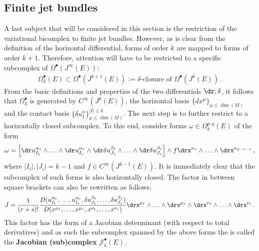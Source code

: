 \subsection{Finite jet bundles}

    A last subject that will be considered in this section is the restriction of the variational bicomplex to finite jet bundles. However, as is clear from the definition of the horizontal differential, forms of order $k$ are mapped to forms of order $k+1$. Therefore, attention will have to be restricted to a specific subcomplex of $\Omega^\bullet(J^\infty(E))$:
    \begin{gather}
        \Omega^\bullet_k(E)\subset\Omega^\bullet(J^{k+1}(E)) := \delta\text{-closure of }\Omega^\bullet(J^k(E))\,.
    \end{gather}
    From the basic definitions and properties of the two differentials $\dr,\delta$, it follows that $\Omega^\bullet_k$ is generated by $C^\infty(J^k(E))$, the horizontal basis $\{dx^\mu\}_{\mu\leq\dim(M)}$ and the contact basis $\{\delta u^\alpha_I\}_{\mu\leq\dim(M)}^{|I|\leq k}$.
    The next step is to further restrict to a horizontally closed subcomplex. To this end, consider forms $\omega\in\Omega^{p,q}_k(E)$ of the form
    \begin{gather}
        \omega = \left[\dr u^{\alpha_1}_{I_1}\wedge\ldots\wedge \dr u^{\alpha_r}_{I_r}\wedge\dr\delta u^{\beta_1}_{J_1}\wedge\ldots\wedge\dr\delta u^{\beta_s}_{J_s}\right]\wedge f\drx^{\kappa_1}\wedge\ldots\wedge \drx^{\kappa_{p-r-s}}\,,
    \end{gather}
    where $|I_i|,|J_i|=k-1$ and $f\in C^\infty(J^{k-1}(E))$. It is immediately clear that the subcomplex of such forms is also horizontally closed. The factor in between square brackets can also be rewritten as follows:
    \begin{gather}
        J = \frac{1}{(r+s)!}\frac{D(u^{\alpha_1}_{I_1},\ldots,u^{\alpha_r}_{I_r},\delta u^{\beta_1}_{J_1},\ldots,\delta u^{\beta_s}_{J_s})}{D(x^{\mu_1},\ldots,x^{\mu_r},x^{\nu_1},\ldots,x^{\nu_s})}\drx^{\mu_1}\wedge\ldots\wedge\drx^{\mu_r}\wedge\drx^{\nu_1}\wedge\ldots\wedge\drx^{\nu_s}\,.
    \end{gather}
    This factor has the form of a Jacobian determinant (with respect to total derivatives) and as such the subcomplex spanned by the above forms the is called the \textbf{Jacobian (sub)complex} $\mathcal{J}^\bullet_k(E)$.

